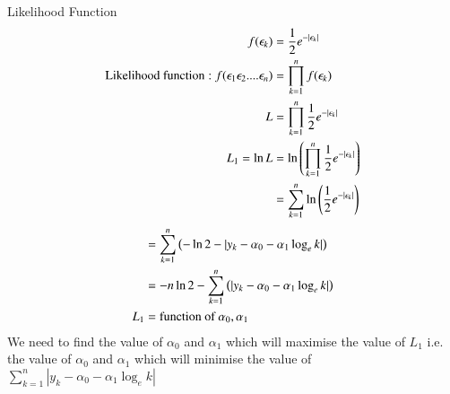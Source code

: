 \documentclass{beamer}
\begin{document}
\begin{frame}[allowframebreaks]{Likelihood Function}
\begin{align}
	f(\epsilon_{k}) &= \frac{1}{2} e^{-|\epsilon_{k}|}\\
	\text{Likelihood function}: f(\epsilon_{1}\epsilon_{2}....\epsilon_{n}) &= \prod_{k = 1}^{n} f(\epsilon_{k})\\
	L     &= \prod_{k = 1}^{n}\frac{1}{2}e^{-|\epsilon_{k}|}\\
L_{1} = \ln L &= \ln\left(\prod_{k = 1}^{n}\frac{1}{2}e^{-|\epsilon_{k}|}\right)\\
	      &= \sum_{k = 1}^{n} \ln\left(\frac{1}{2}e^{-|\epsilon_{k}|}\right)
\end{align}
%
%
\begin{align}
	      &= \sum_{k = 1}^{n} \left(-\ln 2 -|y_{k}-\alpha_{0}-\alpha_{1} \log_{e}k|\right)\\
	      &= -n\ln 2 -\sum_{k = 1}^{n} \left(|y_{k}-\alpha_{0}-\alpha_{1} \log_{e}k|\right)\\  
	L_{1} &= \text{function of }\alpha_{0}, \alpha_{1}
\end{align}
We need to find the value of $\alpha_{0}$ and $\alpha_{1}$ which will maximise the value of $L_{1}$ i.e. the value of 
	$\alpha_{0}$ and $\alpha_{1}$ which will minimise the value of $\sum_{k = 1}^{n}|y_{k}-\alpha_{0}-\alpha_{1} \log_{e}k|$
\end{frame}
\end{document}
